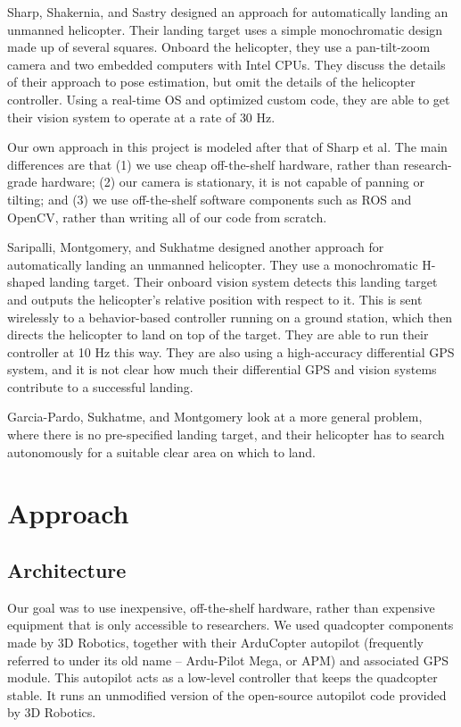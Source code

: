 \documentclass[10pt]{scrartcl} %
\begin{document}
Sharp, Shakernia, and Sastry \cite{sharp_et_al_2001} designed an approach for
automatically landing an unmanned helicopter. Their landing target uses a
simple monochromatic design made up of several squares. Onboard the helicopter,
they use a pan-tilt-zoom camera and two embedded computers with Intel CPUs.
They discuss the details of their approach to pose estimation, but omit the
details of the helicopter controller. Using a real-time OS and optimized custom
code, they are able to get their vision system to operate at a rate of 30 Hz.

Our own approach in this project is modeled after that of Sharp et al. The main
differences are that (1) we use cheap off-the-shelf hardware, rather than
research-grade hardware; (2) our camera is stationary, it is not capable of
panning or tilting; and (3) we use off-the-shelf software components such as
ROS and OpenCV, rather than writing all of our code from scratch.

Saripalli, Montgomery, and Sukhatme \cite{saripalli_et_al_2002} designed
another approach for automatically landing an unmanned helicopter. They use a
monochromatic H-shaped landing target. Their onboard vision system detects this
landing target and outputs the helicopter's relative position with respect to
it. This is sent wirelessly to a behavior-based controller running on a ground
station, which then directs the helicopter to land on top of the target. They
are able to run their controller at 10 Hz this way. They are also using a
high-accuracy differential GPS system, and it is not clear how much their
differential GPS and vision systems contribute to a successful landing.

Garcia-Pardo, Sukhatme, and Montgomery \cite{garcia_pardo_et_al_2002} look at a
more general problem, where there is no pre-specified landing target, and their
helicopter has to search autonomously for a suitable clear area on which to
land.


\section{Approach}

\subsection{Architecture}

Our goal was to use inexpensive, off-the-shelf hardware, rather than expensive
equipment that is only accessible to researchers. We used quadcopter components
made by 3D Robotics, together with their ArduCopter autopilot (frequently
referred to under its old name -- Ardu-Pilot Mega, or APM) and associated GPS
module. This autopilot acts as a low-level controller that keeps the quadcopter
stable. It runs an unmodified version of the open-source autopilot code
provided by 3D Robotics.
\end{document}
